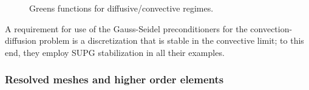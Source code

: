 \documentclass[final,leqno]{siamltex}
\begin{document}
\begin{figure}
\caption{Greens functions for diffusive/convective regimes.}
\end{figure}

A requirement for use of the Gauss-Seidel preconditioners for the convection-diffusion problem is a discretization that is stable in the convective limit; to this end, they employ SUPG stabilization in all their examples.  

\subsubsection{Resolved meshes and higher order elements}
\end{document}
